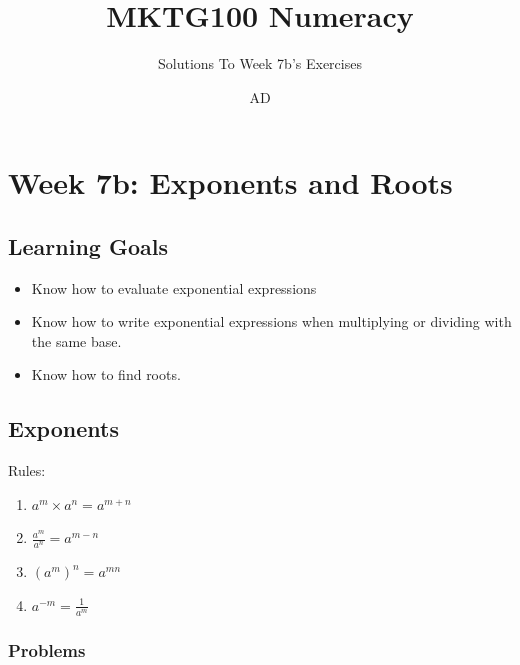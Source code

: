 \documentclass[
  letterpaper,
  DIV=11,
  numbers=noendperiod]{scrartcl}
\title{MKTG100 Numeracy}
\subtitle{Solutions To Week 7b's Exercises}
\author{AD}
\date{}
\providecommand{\tightlist}{%
  \setlength{\itemsep}{0pt}\setlength{\parskip}{0pt}}\usepackage{longtable,booktabs,array}
\renewcommand*\contentsname{Table of contents}
\newcommand\contentsname{Table of contents}
\begin{document}
\maketitle
\ifdefined\Shaded\renewenvironment{Shaded}{\begin{tcolorbox}[interior hidden, borderline west={3pt}{0pt}{shadecolor}, enhanced, boxrule=0pt, breakable, frame hidden, sharp corners]}{\end{tcolorbox}}\fi

\renewcommand*\contentsname{Table of contents}
{
\hypersetup{linkcolor=}
\setcounter{tocdepth}{3}
\tableofcontents
}
\hypertarget{week-7b-exponents-and-roots}{%
\section{Week 7b: Exponents and
Roots}\label{week-7b-exponents-and-roots}}

\hypertarget{learning-goals}{%
\subsection{Learning Goals}\label{learning-goals}}

\begin{itemize}
\tightlist
\item
  Know how to evaluate exponential expressions
\item
  Know how to write exponential expressions when multiplying or dividing
  with the same base.
\item
  Know how to find roots.
\end{itemize}

\hypertarget{exponents}{%
\subsection{Exponents}\label{exponents}}

Rules:

\begin{enumerate}
\def\labelenumi{\arabic{enumi}.}
\item
  \(a^m \times a^n = a^{m+n}\)
\item
  \(\frac{a^m}{a^n} = a^{m-n}\)
\item
  \((a^m)^n=a^{mn}\)
\item
  \(a^{-m}=\frac{1}{a^{m}}\)
\end{enumerate}

\hypertarget{problems}{%
\subsubsection{Problems}\label{problems}}
\end{document}

